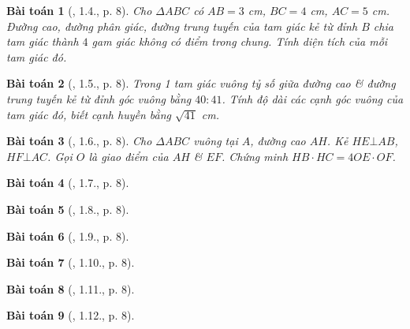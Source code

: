 \documentclass{article}
\newtheorem{baitoan}{Bài toán}
\begin{document}
\begin{baitoan}[\cite{TLCT_THCS_Toan_9_hinh_hoc}, 1.4., p. 8]
	Cho $\Delta ABC$ có $AB = 3$  {\rm cm}, $BC = 4$ {\rm cm}, $AC = 5$ {\rm cm}. Đường cao, đường phân giác, đường trung tuyến của tam giác kẻ từ đỉnh $B$ chia tam giác thành $4$ gam giác không có điểm trong chung. Tính diện tích của mỗi tam giác đó.
\end{baitoan}

\begin{baitoan}[\cite{TLCT_THCS_Toan_9_hinh_hoc}, 1.5., p. 8]
	Trong 1 tam giác vuông tỷ số giữa đường cao \& đường trung tuyến kẻ từ đỉnh góc vuông bằng $40:41$. Tính độ dài các cạnh góc vuông của tam giác đó, biết cạnh huyền bằng $\sqrt{41}$ {\rm cm}.
\end{baitoan}

\begin{baitoan}[\cite{TLCT_THCS_Toan_9_hinh_hoc}, 1.6., p. 8]
	Cho $\Delta ABC$ vuông tại $A$, đường cao $AH$. Kẻ $HE\bot AB$, $HF\bot AC$. Gọi $O$ là giao điểm của $AH$ \& $EF$. Chứng minh $HB\cdot HC = 4OE\cdot OF$.
\end{baitoan}

\begin{baitoan}[\cite{TLCT_THCS_Toan_9_hinh_hoc}, 1.7., p. 8]
	
\end{baitoan}

\begin{baitoan}[\cite{TLCT_THCS_Toan_9_hinh_hoc}, 1.8., p. 8]
	
\end{baitoan}

\begin{baitoan}[\cite{TLCT_THCS_Toan_9_hinh_hoc}, 1.9., p. 8]
	
\end{baitoan}

\begin{baitoan}[\cite{TLCT_THCS_Toan_9_hinh_hoc}, 1.10., p. 8]
	
\end{baitoan}

\begin{baitoan}[\cite{TLCT_THCS_Toan_9_hinh_hoc}, 1.11., p. 8]
	
\end{baitoan}

\begin{baitoan}[\cite{TLCT_THCS_Toan_9_hinh_hoc}, 1.12., p. 8]
	
\end{baitoan}
\end{document}
